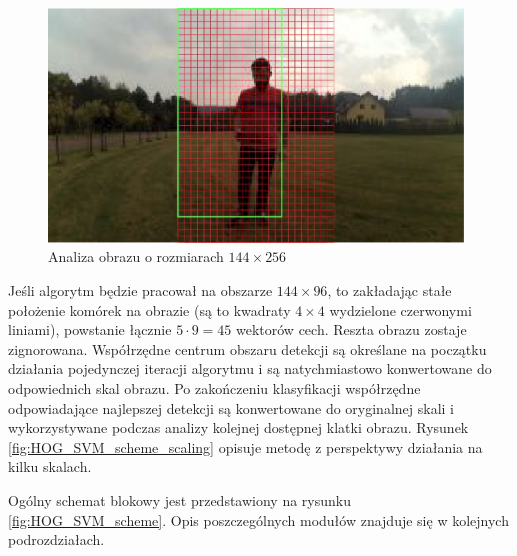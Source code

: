 \begin{figure}[h]
	\centering
	\includegraphics[width=11cm]{4_scaled_hog_example.jpg}
	\caption{Analiza obrazu o rozmiarach $144\times 256$}
	\label{fig:HOG_mesh}
\end{figure}

Jeśli algorytm będzie pracował na obszarze $144\times 96$, to zakładając stałe położenie komórek na obrazie (są to kwadraty $4\times4$ wydzielone czerwonymi liniami), powstanie łącznie $5\cdot9=45$ wektorów cech. 
Reszta obrazu zostaje zignorowana. 
Współrzędne centrum obszaru detekcji są określane na początku działania pojedynczej iteracji algorytmu i są natychmiastowo konwertowane do odpowiednich skal obrazu. Po zakończeniu klasyfikacji współrzędne odpowiadające najlepszej detekcji są konwertowane do oryginalnej skali i wykorzystywane podczas analizy kolejnej dostępnej klatki obrazu. Rysunek \ref{fig:HOG_SVM_scheme_scaling} opisuje metodę z perspektywy działania na kilku skalach.

Ogólny schemat blokowy jest przedstawiony na rysunku \ref{fig:HOG_SVM_scheme}.  Opis poszczególnych modułów znajduje się w kolejnych podrozdziałach. %

